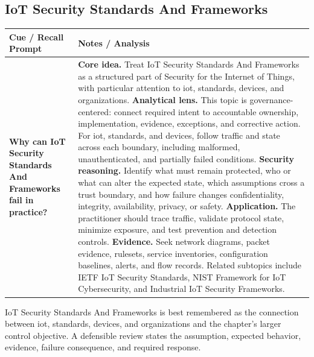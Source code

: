 \documentclass[11pt]{article}
\newcommand{\CornellHeader}{%
\rowcolor{Navy}\color{white}\bfseries Cue / Recall Prompt & \color{white}\bfseries Notes / Analysis\\\hline}
\newcommand{\CornellRow}[2]{%
\cellcolor{CueGray}\RaggedRight\textbf{#1} & \RaggedRight #2\\\hline}
\begin{document}
\subsection*{IoT Security Standards And Frameworks}
\begin{longtable}{>{\RaggedRight\arraybackslash}p{}|>{\RaggedRight\arraybackslash}p{}}
\CornellHeader
\CornellRow{Why can IoT Security Standards And Frameworks fail in practice?}{\textbf{Core idea.} Treat IoT Security Standards And Frameworks as a structured part of Security for the Internet of Things, with particular attention to iot, standards, devices, and organizations. \textbf{Analytical lens.} This topic is governance-centered: connect required intent to accountable ownership, implementation, evidence, exceptions, and corrective action. For iot, standards, and devices, follow traffic and state across each boundary, including malformed, unauthenticated, and partially failed conditions. \textbf{Security reasoning.} Identify what must remain protected, who or what can alter the expected state, which assumptions cross a trust boundary, and how failure changes confidentiality, integrity, availability, privacy, or safety. \textbf{Application.} The practitioner should trace traffic, validate protocol state, minimize exposure, and test prevention and detection controls. \textbf{Evidence.} Seek network diagrams, packet evidence, rulesets, service inventories, configuration baselines, alerts, and flow records. Related subtopics include IETF IoT Security Standards, NIST Framework for IoT Cybersecurity, and Industrial IoT Security Frameworks.}
\end{longtable}
\begin{topicsummary}
IoT Security Standards And Frameworks is best remembered as the connection between iot, standards, devices, and organizations and the chapter's larger control objective. A defensible review states the assumption, expected behavior, evidence, failure consequence, and required response.
\end{topicsummary}
\end{document}
